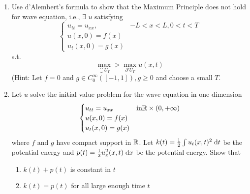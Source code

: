 \begin{enumerate}
\item
  Use d'Alembert's formula to show that the Maximum Principle does not hold for wave equation, i.e., $\exists$ $u$ satisfying
  $$
  \begin{cases}
    u_{tt} = u_{xx}, & -L < x < L, 0 < t < T\\
    u(x, 0) = f(x)\\
    u_t(x, 0) = g(x)
  \end{cases}
  $$
  s.t.
  $$
  \max \limits_{\closure{U}_T} > \max \limits_{\partial' U_T} u(x, t)
  $$
  (Hint: Let $f = 0$ and $g \in C_0^\infty([-1, 1]), g \geq 0$ and choose a small $T$.
\item
  Let $u$ solve the initial value problem for the wave equation in one dimension
  $$
  \begin{cases}
    u_{tt} = u_{xx} & \text{in} \mathbb{R} \times (0, +\infty)\\
    u(x, 0) = f(x)\\
    u_t(x, 0) = g(x)
  \end{cases}
  $$
  where $f$ and $g$ have compact support in $\mathbb{R}$.
  Let $k(t) = \frac{1}{2} \int u_t(x, t)^2 \;\mathrm{d}t$ be the potential energy and $p(t) = \frac{1}{2} u_x^2(x, t) \;\mathrm{d}x$ be the potential energy.
  Show that
  \begin{enumerate}
  \item
    $k(t) + p(t)$ is constant in $t$
  \item
    $k(t) = p(t)$ for all large enough time $t$
  \end{enumerate}
\end{enumerate}
